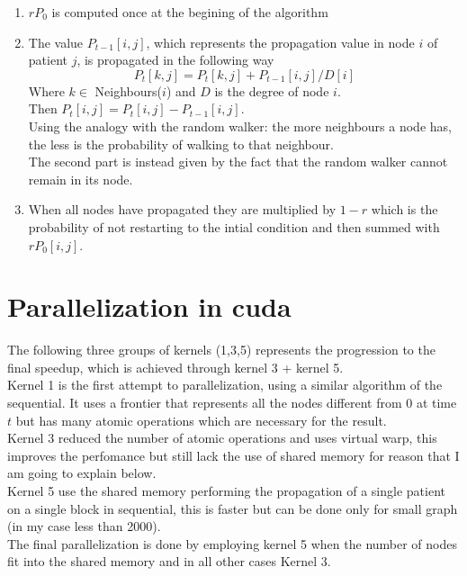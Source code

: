\documentclass[a4paper]{article}
\begin{document}
\begin{enumerate}
    \item $rP_0$ is computed once at the begining of the algorithm
    \begin{figure}[H]
        \centering
        \label{fig:propot1}
    \end{figure}
    \item The value $P_{t-1}[i,j]$, which represents the propagation value in
        node $i$ of patient $j$, is propagated in the following way
        \[
            P_t[k,j] = P_t[k,j] + P_{t-1}[i,j]/D[i]
        \] 
        Where $k \in$ Neighbours($i$) and $D$ is the degree of node $i$.\\
        Then $P_{t}[i,j] =  P_{t}[i,j] - P_{t-1}[i,j]$.\\
        Using the analogy with the random walker: the more neighbours a node
        has, the less is the probability of walking to that neighbour.\\
        The second part is instead given by the fact that the random walker
        cannot remain in its node.
    \begin{figure}[H]
        \centering
        \label{fig:propot2}
    \end{figure}
    \item When all nodes have propagated they are multiplied by $1-r$ which is
        the probability of not restarting to the intial condition and then
        summed with $rP_0[i,j]$.
    \begin{figure}[H]
        \centering
        \label{fig:propot3}
    \end{figure}
\end{enumerate}

\newpage
\section{Parallelization in cuda}
The following three groups of kernels (1,3,5) represents the progression to the final
speedup, which is achieved through kernel 3  + kernel 5.\\
Kernel 1 is the first attempt to parallelization, using a similar algorithm
of the sequential.
It uses a frontier that represents all the nodes different from 0 at
time $t$ but has many atomic operations which are necessary for the
result.\\
Kernel 3 reduced the number of atomic operations and uses virtual warp, this
improves the perfomance but still lack the use of shared memory for reason that
I am going to explain below.\\
Kernel 5 use the shared memory performing the propagation of a single patient on a 
single block in sequential, this is faster but can be done only for small
graph (in my case less than 2000).\\
The final parallelization is done by employing kernel 5 when the number of nodes
fit into the shared memory and in all other cases Kernel 3.
\end{document}
